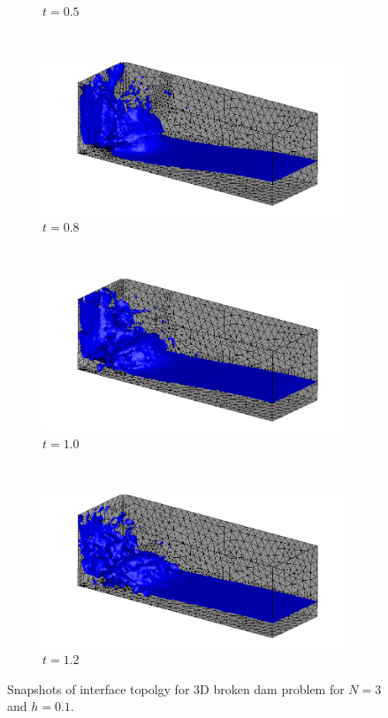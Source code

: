 \documentclass[11pt,a4paper,twoside]{article}
\begin{document}
\begin{figure}[ht!]
\begin{center}
\begin{subfigure}[]{0.3\textwidth}
				\caption{$ t=0.5 $}
			\end{subfigure}
			~
			\begin{subfigure}[]{0.3\textwidth}
				\includegraphics[width=\textwidth]{3D_Dam_t1_00.png}
				\caption{$ t=0.8 $}
			\end{subfigure}	
			~
			\begin{subfigure}[]{0.3\textwidth}
				\includegraphics[width=\textwidth]{3D_Dam_t1_20.png}
				\caption{$ t=1.0 $}
			\end{subfigure}
			~
			\begin{subfigure}[]{0.3\textwidth}
				\includegraphics[width=\textwidth]{3D_Dam_t1_40.png}
				\caption{$ t=1.2 $}
			\end{subfigure}		
		\end{center}
		\caption{Snapshots of interface topolgy for 3D broken dam problem for $ N=3 $ and $ h=0.1 $. }
		\label{Fig:3DDamBreakInterface}
	\end{figure}
	
\end{document}
